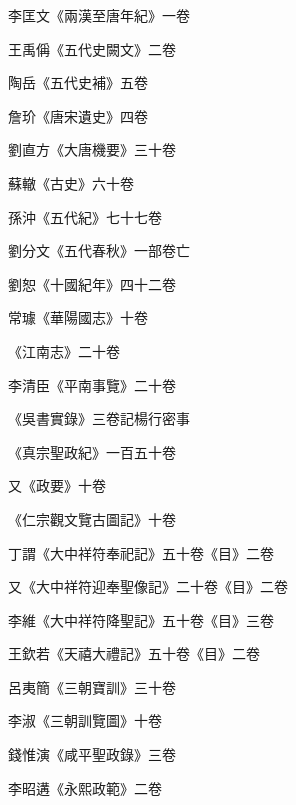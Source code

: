 \begin{pinyinscope}
 李匡文《兩漢至唐年紀》一卷



 王禹偁《五代史闕文》二卷



 陶岳《五代史補》五卷



 詹玠《唐宋遺史》四卷



 劉直方《大唐機要》三十卷



 蘇轍《古史》六十卷



 孫沖《五代紀》七十七卷



 劉分文《五代春秋》一部卷亡



 劉恕《十國紀年》四十二卷



 常璩《華陽國志》十卷



 《江南志》二十卷



 李清臣《平南事覽》二十卷



 《吳書實錄》三卷記楊行密事



 《真宗聖政紀》一百五十卷



 又《政要》十卷



 《仁宗觀文覽古圖記》十卷



 丁謂《大中祥符奉祀記》五十卷《目》二卷



 又《大中祥符迎奉聖像記》二十卷《目》二卷



 李維《大中祥符降聖記》五十卷《目》三卷



 王欽若《天禧大禮記》五十卷《目》二卷



 呂夷簡《三朝寶訓》三十卷



 李淑《三朝訓覽圖》十卷



 錢惟演《咸平聖政錄》三卷



 李昭遘《永熙政範》二卷




\end{pinyinscope}
